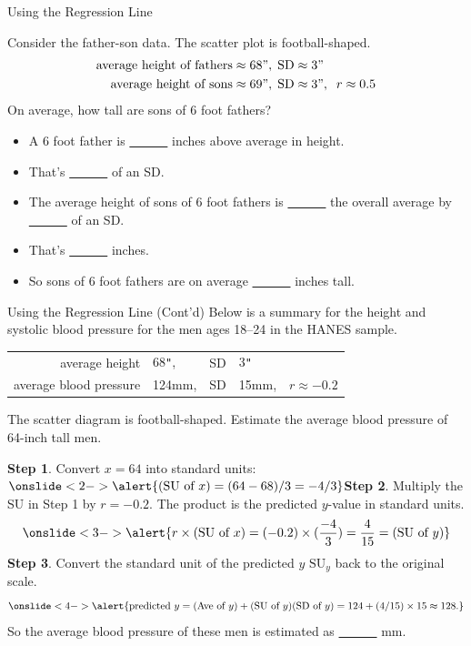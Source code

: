\documentclass[
  ignorenonframetext,
]{beamer}
\providecommand{\tightlist}{%
  \setlength{\itemsep}{0pt}\setlength{\parskip}{0pt}}
\newcommand{\Hide}[2]{\underline{~~~\onslide<#1>{\alert{#2}}~~~}}
\newcommand{\hid}[2]{\onslide<#1>{\alert{#2}}}
\begin{document}
\begin{frame}{Using the Regression Line}
\protect\hypertarget{using-the-regression-line}{}
\newcommand\inch{{\tt "}}
\newcommand\foot{{\tt '}}

Consider the father-son data. The scatter plot is football-shaped.
\begin{align*}
\text{average height of fathers}&\approx68{\tt "},\;\text{SD}\approx 3{\tt "}\\
\text{average height of sons}   &\approx69{\tt "},\;\text{SD}\approx 3{\tt "},\;\; r\approx 0.5
\end{align*} On average, how tall are sons of 6 foot fathers?

\begin{itemize}
\tightlist
\item
  A 6 foot father is \Hide{2-}{4} inches above average in height.
\item
  That's \Hide{3-}{4/3} of an SD.
\item
  The average height of sons of 6 foot fathers is \Hide{3-}{above} the
  overall average by \Hide{4-}{$0.5\times4/3=2/3$} of an SD.
\item
  That's \Hide{5-}{2} inches.
\item
  So sons of 6 foot fathers are on average \Hide{6-}{$69+2=71$} inches
  tall.
\end{itemize}
\end{frame}

\begin{frame}{Using the Regression Line (Cont'd)}
\protect\hypertarget{using-the-regression-line-contd}{}
Below is a summary for the height and systolic blood pressure for the
men ages 18--24 in the HANES sample.

\begin{center}
\tabcolsep=4pt
\begin{tabular}{r@{$\,\approx\,$}lr@{$\,\approx\,$}lc}
average height&68{\tt "},&SD&3{\tt "}\\[-3pt]
average blood pressure&124mm,&SD&15mm,& $r\approx -0.2$
\end{tabular}
\end{center}

The scatter diagram is football-shaped. Estimate the average blood
pressure of 64-inch tall men.\small

\textbf{Step 1}. Convert \(x=64\) into standard units:
\(\hid{2-}{(\text{SU of }x) =(64-68)/3=-4/3}\)\newline \textbf{Step 2}.
Multiply the SU in Step 1 by \(r=-0.2\). The product is the predicted
\(y\)-value in standard units.
\[\hid{3-}{r\times (\text{SU of }x) =(-0.2)\times(\dfrac{-4}{3})=\dfrac{4}{15}=(\text{SU of }y)}\]
\textbf{Step 3}. Convert the standard unit of the predicted \(y\)
\(\text{SU}_y\) back to the original scale.
\[\hid{4-}{\text{predicted }y=(\text{Ave of }y)+ (\text{SU of }y)(\text{SD of }y)=124+(4/15)\times 15\approx 128.}\]
So the average blood pressure of these men is estimated as
\Hide{5-}{128} mm.
\end{frame}
\end{document}
